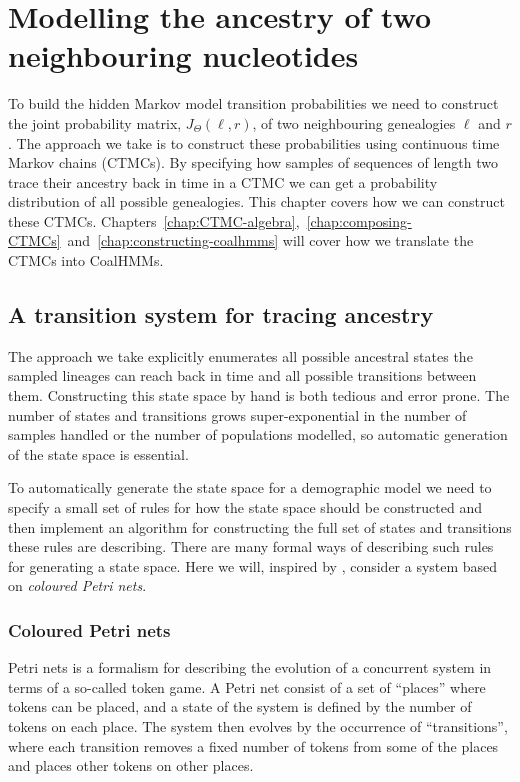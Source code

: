 \chapter{Modelling the ancestry of two neighbouring nucleotides}
\label{chap:modelling-2-ARGs}

To build the hidden Markov model transition probabilities we need to construct the joint probability matrix, $J_\Theta(\ell,r)$, of two neighbouring genealogies $\ell$ and $r$. The approach we take is to construct these probabilities using continuous time Markov chains (CTMCs). By specifying how samples of sequences of length two trace their ancestry back in time in a CTMC we can get a probability distribution of all possible genealogies. This chapter covers how we can construct these CTMCs. Chapters~\ref{chap:CTMC-algebra},~\ref{chap:composing-CTMCs}~and~\ref{chap:constructing-coalhmms} will cover how we translate the CTMCs into CoalHMMs.

\section{A transition system for tracing ancestry}

The approach we take explicitly enumerates all possible ancestral states the sampled lineages can reach back in time and all possible transitions between them. Constructing this state space by hand is both tedious and error prone. The number of states and transitions grows super-exponential in the number of samples handled or the number of populations modelled, so automatic generation of the state space is essential.

To automatically generate the state space for a demographic model we need to specify a small set of rules for how the state space should be constructed and then implement an algorithm for constructing the full set of states and transitions these rules are describing. There are many formal ways of describing such rules for generating a state space. Here we will, inspired by \citet{springerlink:10.1007/978-3-642-31131-4_3}, consider a system based on \emph{coloured Petri nets}.

\subsection{Coloured Petri nets}

Petri nets is a formalism for describing the evolution of a concurrent system in terms of a so-called token game. A Petri net consist of a set of ``places'' where tokens can be placed, and a state of the system is defined by the number of tokens on each place. The system then evolves by the occurrence of ``transitions'', where each transition removes a fixed number of tokens from some of the places and places other tokens on other places.

